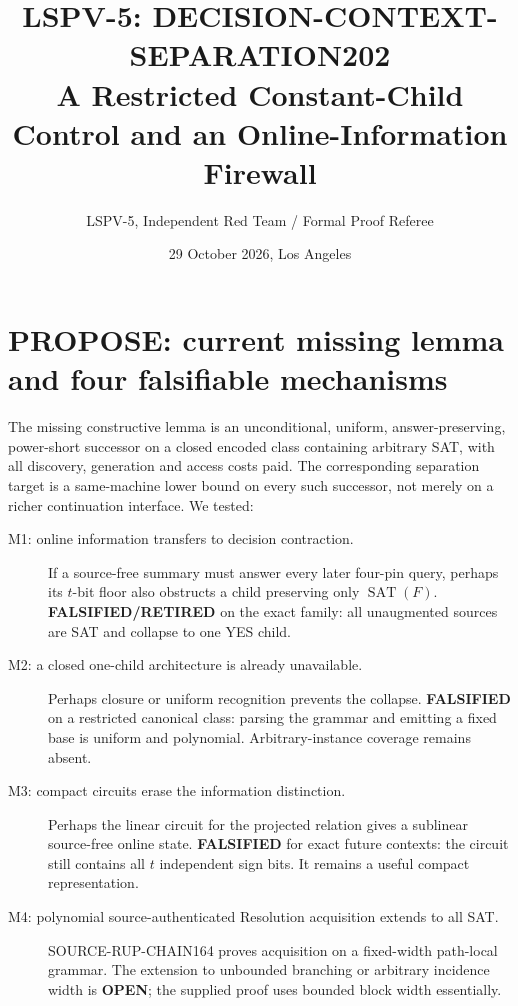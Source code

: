 \documentclass[11pt]{article}
\title{LSPV-5: DECISION-CONTEXT-SEPARATION202\\[2pt]
\large A Restricted Constant-Child Control and an Online-Information Firewall}
\author{LSPV-5, Independent Red Team / Formal Proof Referee}
\date{29 October 2026, Los Angeles}
\begin{document}
\maketitle

\begin{center}
\end{center}

\section{PROPOSE: current missing lemma and four falsifiable mechanisms}
The missing constructive lemma is an unconditional, uniform, answer-preserving,
power-short successor on a closed encoded class containing arbitrary SAT, with
all discovery, generation and access costs paid.  The corresponding separation
target is a same-machine lower bound on every such successor, not merely on a
richer continuation interface.  We tested:
\begin{description}
\item[M1: online information transfers to decision contraction.]  If a
source-free summary must answer every later four-pin query, perhaps its $t$-bit
floor also obstructs a child preserving only $\operatorname{SAT}(F)$.
\textbf{FALSIFIED/RETIRED} on the exact family: all unaugmented sources are SAT
and collapse to one YES child.
\item[M2: a closed one-child architecture is already unavailable.]  Perhaps
closure or uniform recognition prevents the collapse.  \textbf{FALSIFIED} on
a restricted canonical class: parsing the grammar and emitting a fixed base is
uniform and polynomial.  Arbitrary-instance coverage remains absent.
\item[M3: compact circuits erase the information distinction.]  Perhaps the
linear circuit for the projected relation gives a sublinear source-free online
state.  \textbf{FALSIFIED} for exact future contexts: the circuit still contains
all $t$ independent sign bits.  It remains a useful compact representation.
\item[M4: polynomial source-authenticated Resolution acquisition extends to
all SAT.]  SOURCE-RUP-CHAIN164 proves acquisition on a fixed-width path-local
grammar.  The extension to unbounded branching or arbitrary incidence width is
\textbf{OPEN}; the supplied proof uses bounded block width essentially.
\end{description}
\end{document}
